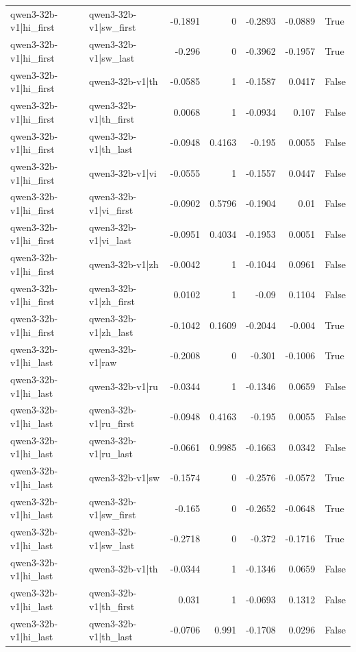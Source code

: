 \begin{table}
\begin{tabular}{l l r r r r l}
qwen3-32b-v1|hi_first & qwen3-32b-v1|sw_first & -0.1891 & 0 & -0.2893 & -0.0889 & True \\
qwen3-32b-v1|hi_first & qwen3-32b-v1|sw_last & -0.296 & 0 & -0.3962 & -0.1957 & True \\
qwen3-32b-v1|hi_first & qwen3-32b-v1|th & -0.0585 & 1 & -0.1587 & 0.0417 & False \\
qwen3-32b-v1|hi_first & qwen3-32b-v1|th_first & 0.0068 & 1 & -0.0934 & 0.107 & False \\
qwen3-32b-v1|hi_first & qwen3-32b-v1|th_last & -0.0948 & 0.4163 & -0.195 & 0.0055 & False \\
qwen3-32b-v1|hi_first & qwen3-32b-v1|vi & -0.0555 & 1 & -0.1557 & 0.0447 & False \\
qwen3-32b-v1|hi_first & qwen3-32b-v1|vi_first & -0.0902 & 0.5796 & -0.1904 & 0.01 & False \\
qwen3-32b-v1|hi_first & qwen3-32b-v1|vi_last & -0.0951 & 0.4034 & -0.1953 & 0.0051 & False \\
qwen3-32b-v1|hi_first & qwen3-32b-v1|zh & -0.0042 & 1 & -0.1044 & 0.0961 & False \\
qwen3-32b-v1|hi_first & qwen3-32b-v1|zh_first & 0.0102 & 1 & -0.09 & 0.1104 & False \\
qwen3-32b-v1|hi_first & qwen3-32b-v1|zh_last & -0.1042 & 0.1609 & -0.2044 & -0.004 & True \\
qwen3-32b-v1|hi_last & qwen3-32b-v1|raw & -0.2008 & 0 & -0.301 & -0.1006 & True \\
qwen3-32b-v1|hi_last & qwen3-32b-v1|ru & -0.0344 & 1 & -0.1346 & 0.0659 & False \\
qwen3-32b-v1|hi_last & qwen3-32b-v1|ru_first & -0.0948 & 0.4163 & -0.195 & 0.0055 & False \\
qwen3-32b-v1|hi_last & qwen3-32b-v1|ru_last & -0.0661 & 0.9985 & -0.1663 & 0.0342 & False \\
qwen3-32b-v1|hi_last & qwen3-32b-v1|sw & -0.1574 & 0 & -0.2576 & -0.0572 & True \\
qwen3-32b-v1|hi_last & qwen3-32b-v1|sw_first & -0.165 & 0 & -0.2652 & -0.0648 & True \\
qwen3-32b-v1|hi_last & qwen3-32b-v1|sw_last & -0.2718 & 0 & -0.372 & -0.1716 & True \\
qwen3-32b-v1|hi_last & qwen3-32b-v1|th & -0.0344 & 1 & -0.1346 & 0.0659 & False \\
qwen3-32b-v1|hi_last & qwen3-32b-v1|th_first & 0.031 & 1 & -0.0693 & 0.1312 & False \\
qwen3-32b-v1|hi_last & qwen3-32b-v1|th_last & -0.0706 & 0.991 & -0.1708 & 0.0296 & False \\

\end{tabular}
\end{table}
